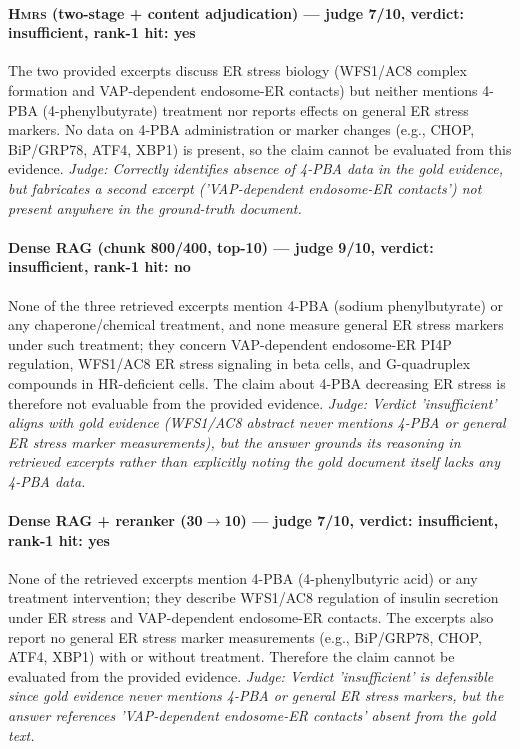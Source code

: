 \documentclass[sigconf, review, anonymous]{acmart}
\begin{document}
\paragraph{\textbf{\textsc{Hmrs}} (two-stage + content adjudication) --- judge 7/10, verdict: insufficient, rank-1 hit: yes}
\noindent The two provided excerpts discuss ER stress biology (WFS1/AC8 complex formation and VAP-dependent endosome-ER contacts) but neither mentions 4-PBA (4-phenylbutyrate) treatment nor reports effects on general ER stress markers. No data on 4-PBA administration or marker changes (e.g., CHOP, BiP/GRP78, ATF4, XBP1) is present, so the claim cannot be evaluated from this evidence.
\noindent\small\textit{Judge: Correctly identifies absence of 4-PBA data in the gold evidence, but fabricates a second excerpt ('VAP-dependent endosome-ER contacts') not present anywhere in the ground-truth document.}
\paragraph{Dense RAG (chunk 800/400, top-10) --- judge 9/10, verdict: insufficient, rank-1 hit: no}
\noindent None of the three retrieved excerpts mention 4-PBA (sodium phenylbutyrate) or any chaperone/chemical treatment, and none measure general ER stress markers under such treatment; they concern VAP-dependent endosome-ER PI4P regulation, WFS1/AC8 ER stress signaling in beta cells, and G-quadruplex compounds in HR-deficient cells. The claim about 4-PBA decreasing ER stress is therefore not evaluable from the provided evidence.
\noindent\small\textit{Judge: Verdict 'insufficient' aligns with gold evidence (WFS1/AC8 abstract never mentions 4-PBA or general ER stress marker measurements), but the answer grounds its reasoning in retrieved excerpts rather than explicitly noting the gold document itself lacks any 4-PBA data.}
\paragraph{Dense RAG + reranker (30$\to$10) --- judge 7/10, verdict: insufficient, rank-1 hit: yes}
\noindent None of the retrieved excerpts mention 4-PBA (4-phenylbutyric acid) or any treatment intervention; they describe WFS1/AC8 regulation of insulin secretion under ER stress and VAP-dependent endosome-ER contacts. The excerpts also report no general ER stress marker measurements (e.g., BiP/GRP78, CHOP, ATF4, XBP1) with or without treatment. Therefore the claim cannot be evaluated from the provided evidence.
\noindent\small\textit{Judge: Verdict 'insufficient' is defensible since gold evidence never mentions 4-PBA or general ER stress markers, but the answer references 'VAP-dependent endosome-ER contacts' absent from the gold text.}
\end{document}
